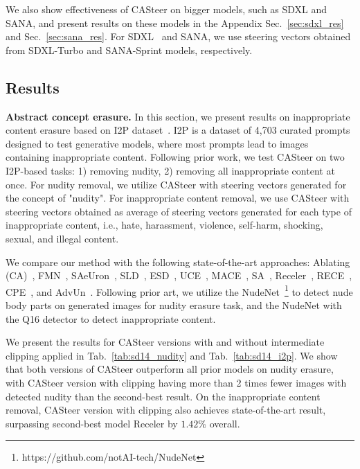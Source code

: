 We also show effectiveness of CASteer on bigger models, such as SDXL and SANA, and present results on these models in the Appendix Sec.~\ref{sec:sdxl_res} and Sec.~\ref{sec:sana_res}. For SDXL~\cite{DBLP:conf/iclr/PodellELBDMPR24} and SANA, we use steering vectors obtained from SDXL-Turbo and SANA-Sprint models, respectively. %



% 

% 


%

\subsection{Results}
\vspace{-0.2cm}
\textbf{Abstract concept erasure.}
In this section, we present results on inappropriate content erasure based on I2P dataset~\cite{DBLP:conf/cvpr/SchramowskiBDK23}. I2P is a dataset of 4,703 curated prompts designed to test generative models, where most prompts lead to images containing inappropriate content. Following prior work, we test CASteer on two I2P-based tasks: 1) removing nudity, 2) removing all inappropriate content at once. For nudity removal, we utilize CASteer with steering vectors generated for the concept of "nudity". For inappropriate content removal, we use CASteer with steering vectors obtained as average of steering vectors generated for each type of inappropriate content, i.e., hate, harassment, violence, self-harm, shocking, sexual, and illegal content. 

We compare our method with the following state-of-the-art approaches: Ablating (CA)~\cite{DBLP:conf/iccv/KumariZWS0Z23}, FMN~\cite{zhang2023forgetmenot},
SAeUron~\cite{cywinski2025saeuron},
SLD~\cite{DBLP:conf/cvpr/SchramowskiBDK23}, ESD~\cite{DBLP:conf/iccv/GandikotaMFB23}, UCE~\cite{DBLP:conf/wacv/GandikotaOBMB24},
MACE~\cite{DBLP:conf/cvpr/LuWLLK24},
SA~\cite{DBLP:conf/nips/HengS23},
Receler~\cite{huang2023receler},
RECE~\cite{DBLP:conf/eccv/GongCWCJ24}, CPE~\cite{lee2024cpe}, and AdvUn~\cite{zhang2024defensive}. Following prior art, we utilize the NudeNet~\footnote{https://github.com/notAI-tech/NudeNet} to detect nude body parts on generated images for nudity erasure task, and the NudeNet with the Q16 detector to detect inappropriate content.

We present the results for CASteer versions with and without intermediate clipping applied in Tab.~\ref{tab:sd14_nudity} and Tab.~\ref{tab:sd14_i2p}. We show that both versions of CASteer outperform all prior models on nudity erasure, with CASteer version with clipping having more than 2 times fewer images with detected nudity than the second-best result. On the inappropriate content removal, CASteer version with clipping also achieves state-of-the-art result, surpassing second-best model Receler by $1.42\%$ overall.


